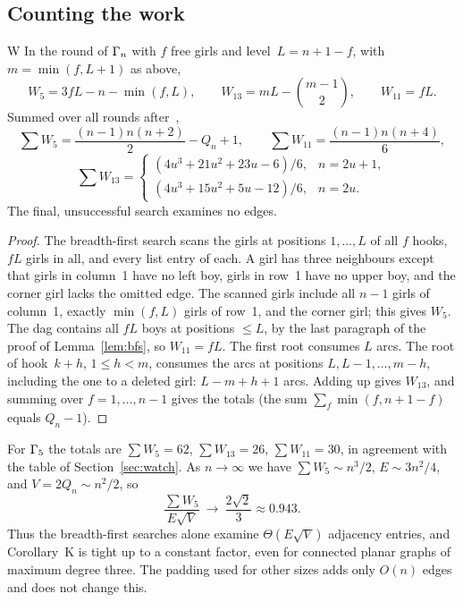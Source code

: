 \subsection{Counting the work}
\label{sec:work}

\begin{lthm}{W}
In the round of $\Gamma_n$ with $f$ free girls and level~$L=n+1-f$, with
$m=\min(f,L+1)$ as above,
\[
   W_5=3fL-n-\min(f,L),\qquad W_{13}=mL-\binom{m-1}{2},\qquad W_{11}=fL.
\]
Summed over all rounds after~,
\[
  \sum W_5=\frac{(n-1)n(n+2)}2-Q_n+1,\qquad \sum W_{11}=\frac{(n-1)n(n+4)}6,
\]
\[
  \sum W_{13}=\begin{cases}(4u^3+21u^2+23u-6)/6,& n=2u+1,\\
                 (4u^3+15u^2+5u-12)/6,& n=2u.\end{cases}
\]
The final, unsuccessful search examines no edges.
\end{lthm}

\begin{proof}
The breadth-first search scans the girls at positions $1,\ldots,L$ of all
$f$ hooks, $fL$ girls in all, and every list entry of each. A girl has
three neighbours except that girls in column~1 have no left boy, girls in
row~1 have no upper boy, and the corner girl lacks the omitted edge. The
scanned girls include all $n-1$ girls of column~1, exactly $\min(f,L)$
girls of row~1, and the corner girl; this gives $W_5$. The dag contains
all $fL$ boys at positions $\le L$, by the last paragraph of the proof of
Lemma~\ref{lem:bfs}, so $W_{11}=fL$. The first root consumes $L$ arcs. The
root of hook~$k+h$, $1\le h<m$, consumes the arcs at positions
$L,L-1,\ldots,m-h$, including the one to a deleted girl: $L-m+h+1$
arcs. Adding up gives $W_{13}$, and summing over $f=1,\ldots,n-1$ gives the
totals (the sum $\sum_f\min(f,n+1-f)$ equals $Q_n-1$).
\end{proof}

For $\Gamma_5$ the totals are $\sum W_5=62$, $\sum W_{13}=26$, $\sum W_{11}=30$, in agreement with the
table of Section~\ref{sec:watch}. As $n\to\infty$ we have $\sum W_5\sim n^3/2$,
$E\sim3n^2/4$, and $V=2Q_n\sim n^2/2$, so
\[
   \frac{\sum W_5}{E\sqrt V}\ \longrightarrow\ \frac{2\sqrt2}{3}\approx0.943 .
\]
Thus the breadth-first searches alone examine $\Theta(E\sqrt V)$
adjacency entries, and Corollary~K is tight up to a constant factor,
even for connected planar graphs of maximum degree three. The padding
used for other sizes adds only $O(n)$ edges and does not change this.
